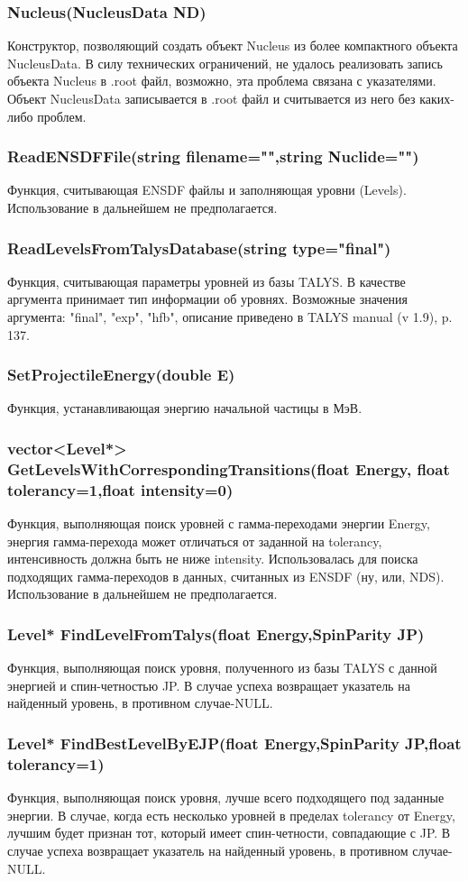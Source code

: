 \documentclass[a4paper,12pt]{extarticle}
\begin{document}
\subsubsection{Nucleus(NucleusData ND)}
Конструктор, позволяющий создать объект Nucleus из более компактного объекта NucleusData. В силу технических ограничений, не удалось реализовать запись объекта Nucleus в .root файл, возможно, эта проблема связана с указателями. Объект NucleusData записывается в .root файл и считывается из него без каких-либо проблем.
\subsubsection{ReadENSDFFile(string filename="",string Nuclide="")}
Функция, считывающая ENSDF файлы и заполняющая уровни (Levels). Использование в дальнейшем не предполагается.
\subsubsection{ReadLevelsFromTalysDatabase(string type="final")}
Функция, считывающая параметры уровней из базы TALYS. В качестве аргумента принимает тип информации об уровнях. Возможные значения аргумента: "final", "exp", "hfb", описание приведено в TALYS manual (v 1.9), p. 137.
\subsubsection{SetProjectileEnergy(double E)}
Функция, устанавливающая энергию начальной частицы в МэВ.
\subsubsection{vector<Level*> GetLevelsWithCorrespondingTransitions(float Energy, float tolerancy=1,float intensity=0)}
Функция, выполняющая поиск уровней с гамма-переходами энергии Energy, энергия гамма-перехода может отличаться от заданной на tolerancy, интенсивность должна быть не ниже intensity. Использовалась для поиска подходящих гамма-переходов в данных, считанных из ENSDF (ну, или, NDS). Использование в дальнейшем не предполагается.
\subsubsection{Level* FindLevelFromTalys(float Energy,SpinParity JP)}
Функция, выполняющая поиск уровня, полученного из базы TALYS с данной энергией и спин-четностью JP. В случае успеха возвращает указатель на найденный уровень, в противном случае-NULL.
\subsubsection{Level* FindBestLevelByEJP(float Energy,SpinParity JP,float tolerancy=1)}
Функция, выполняющая поиск уровня, лучше всего подходящего под заданные энергии. В случае, когда есть несколько уровней в пределах tolerancy от Energy, лучшим будет признан тот, который имеет спин-четности, совпадающие с JP. В случае успеха возвращает указатель на найденный уровень, в противном случае-NULL.
\end{document}
